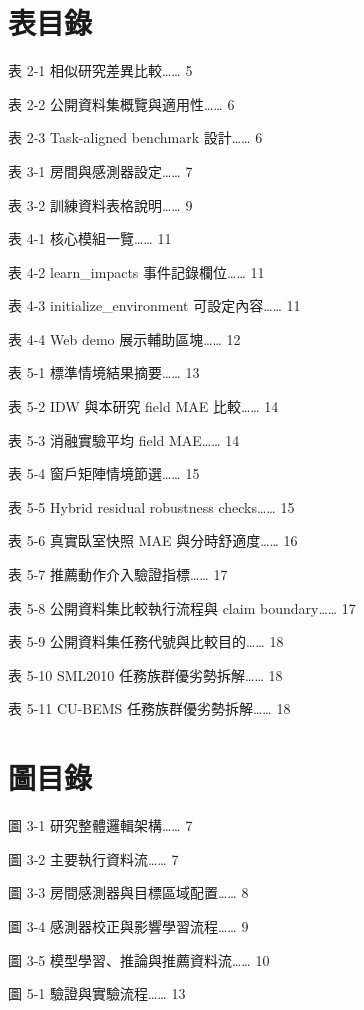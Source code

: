 \documentclass[12pt,a4paper]{article}
\begin{document}
\section*{表目錄}

表 2-1 相似研究差異比較…… 5


表 2-2 公開資料集概覽與適用性…… 6


表 2-3 Task-aligned benchmark 設計…… 6


表 3-1 房間與感測器設定…… 7


表 3-2 訓練資料表格說明…… 9


表 4-1 核心模組一覽…… 11


表 4-2 learn\_\allowbreak{}impacts 事件記錄欄位…… 11


表 4-3 initialize\_\allowbreak{}environment 可設定內容…… 11


表 4-4 Web demo 展示輔助區塊…… 12


表 5-1 標準情境結果摘要…… 13


表 5-2 IDW 與本研究 field MAE 比較…… 14


表 5-3 消融實驗平均 field MAE…… 14


表 5-4 窗戶矩陣情境節選…… 15


表 5-5 Hybrid residual robustness checks…… 15


表 5-6 真實臥室快照 MAE 與分時舒適度…… 16


表 5-7 推薦動作介入驗證指標…… 17


表 5-8 公開資料集比較執行流程與 claim boundary…… 17


表 5-9 公開資料集任務代號與比較目的…… 18


表 5-10 SML2010 任務族群優劣勢拆解…… 18


表 5-11 CU-BEMS 任務族群優劣勢拆解…… 18


\clearpage

\section*{圖目錄}

圖 3-1 研究整體邏輯架構…… 7


圖 3-2 主要執行資料流…… 7


圖 3-3 房間感測器與目標區域配置…… 8


圖 3-4 感測器校正與影響學習流程…… 9


圖 3-5 模型學習、推論與推薦資料流…… 10


圖 5-1 驗證與實驗流程…… 13
\end{document}

